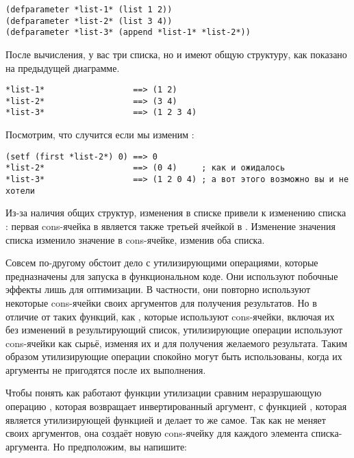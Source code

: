 \begin{lstlisting}
(defparameter *list-1* (list 1 2))
(defparameter *list-2* (list 3 4))
(defparameter *list-3* (append *list-1* *list-2*))
\end{lstlisting}

После вычисления, у вас три списка, но  и  имеют общую
структуру, как показано на предыдущей диаграмме.

\begin{lstlisting}
*list-1*                  ==> (1 2)
*list-2*                  ==> (3 4)
*list-3*                  ==> (1 2 3 4)
\end{lstlisting}

Посмотрим, что случится если мы изменим :

\begin{lstlisting}
(setf (first *list-2*) 0) ==> 0
*list-2*                  ==> (0 4)     ; как и ожидалось
*list-3*                  ==> (1 2 0 4) ; а вот этого возможно вы и не хотели
\end{lstlisting}

Из-за наличия общих структур, изменения в списке  привели к изменению списка
: первая cons-ячейка в  является также третьей ячейкой в
. Изменение значения  списка  изменило значение
 в cons-ячейке, изменив оба списка.

Совсем по-другому обстоит дело с утилизирующими операциями, которые предназначены для
запуска в функциональном коде. Они используют побочные эффекты лишь для оптимизации. В
частности, они повторно используют некоторые cons-ячейки своих аргументов для получения
результатов. Но в отличие от таких функций, как , которые используют
cons-ячейки, включая их без изменений в результирующий список, утилизирующие операции
используют cons-ячейки как сырьё, изменяя их  и  для получения
желаемого результата. Таким образом утилизирующие операции спокойно могут быть
использованы, когда их аргументы не пригодятся после их выполнения.

Чтобы понять как работают функции утилизации сравним неразрушающую операцию
, которая возвращает инвертированный аргумент, с функцией ,
которая является утилизирующей функцией и делает то же самое. Так как  не
меняет своих аргументов, она создаёт новую cons-ячейку для каждого элемента
списка-аргумента. Но предположим, вы напишите:

